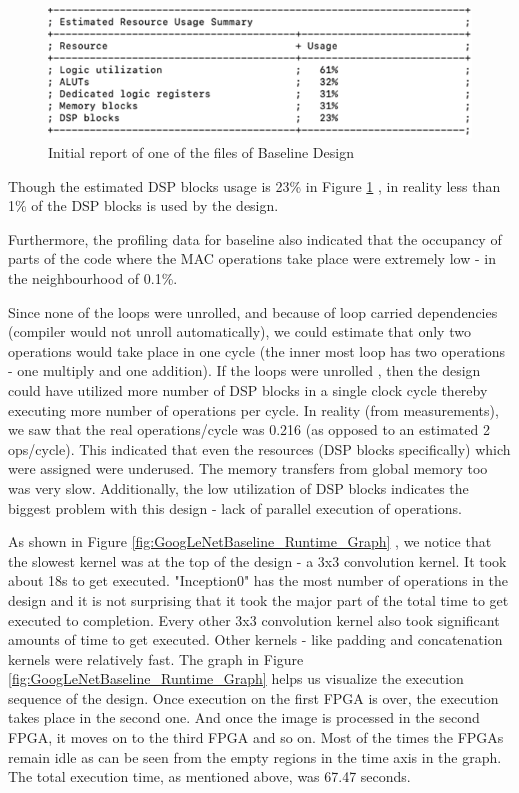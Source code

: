 \begin{figure}[!htb]
  \includegraphics[width=\textwidth,height=\textheight,keepaspectratio]{img/Report_Baseline.png}
  \caption{Initial report of one of the files of Baseline Design}
  \label{fig:Report_Baseline}
\end{figure}

Though the estimated DSP blocks usage is 23\% in Figure \ref{fig:Report_Baseline} , in reality less than 1\% of the DSP blocks is used by the design. 

Furthermore, the profiling data for baseline also indicated that the occupancy of  parts of the code where the MAC operations take place were extremely low - in the neighbourhood of 0.1\%. 

Since none of the loops were unrolled, and because of loop carried dependencies (compiler would not unroll automatically), we could estimate that only two operations would take place in one cycle (the inner most loop has two operations - one multiply and one addition). If the loops were unrolled , then the design could have utilized more number of DSP blocks in a single clock cycle thereby executing more number of operations per cycle. In reality (from measurements), we saw that the real operations/cycle was 0.216 (as opposed to an estimated 2 ops/cycle). This indicated that even the resources (DSP blocks specifically) which were assigned were underused. The memory transfers from global memory too was very slow. Additionally, the low utilization of DSP blocks indicates the biggest problem with this design - lack of parallel execution of operations.  

As shown in Figure \ref{fig:GoogLeNetBaseline_Runtime_Graph} , we notice that the slowest kernel was at the top of the design - a 3x3 convolution kernel. It took about 18s to get executed. "Inception0" has the most number of operations in the design and it is not surprising that it took the major part of the total time to get executed to completion. Every other 3x3 convolution kernel also took significant amounts of time to get executed. Other kernels - like padding and concatenation kernels were relatively fast. The graph in Figure \ref{fig:GoogLeNetBaseline_Runtime_Graph} helps us visualize the execution sequence of the design. Once execution on the first FPGA is over, the execution takes place in the second one. And once the image is processed in the second FPGA, it moves on to the third FPGA and so on. Most of the times the FPGAs remain idle as can be seen from the empty regions in the time axis in the graph. The total execution time, as mentioned above, was 67.47 seconds.

